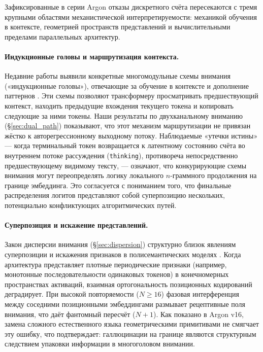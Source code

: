 \documentclass[11pt,a4paper]{article}
\begin{document}
Зафиксированные в серии Argon отказы дискретного счёта пересекаются с тремя крупными областями механистической интерпретируемости: механикой обучения в контексте, геометрией пространств представлений и вычислительными пределами параллельных архитектур.

\paragraph{Индукционные головы и маршрутизация контекста.} Недавние работы выявили конкретные многомодульные схемы внимания («индукционные головы»), отвечающие за обучение в контексте и дополнение паттернов \cite{olsson2022incontext}. Эти схемы позволяют трансформеру просматривать предшествующий контекст, находить предыдущие вхождения текущего токена и копировать следующие за ними токены. Наши результаты по двухканальному вниманию (\S\ref{sec:dual_path}) показывают, что этот механизм маршрутизации не привязан жёстко к авторегрессионному выходному потоку. Наблюдаемые «утечки истины» — когда терминальный токен возвращается к латентному состоянию счёта во внутреннем потоке рассуждения (\texttt{thinking}), противореча непосредственно предшествующему видимому тексту, — означают, что конкурирующие схемы внимания могут переопределять логику локального $n$-граммного продолжения на границе эмбеддинга. Это согласуется с пониманием того, что финальные распределения логитов представляют собой суперпозицию нескольких, потенциально конфликтующих алгоритмических путей.

\paragraph{Суперпозиция и искажение представлений.} Закон дисперсии внимания (\S\ref{sec:dispersion}) структурно близок явлениям суперпозиции и искажения признаков в полисемантических моделях \cite{elhage2022toy, cammarata2020circuits}. Когда архитектура представляет плотные периодические признаки (например, монотонные последовательности одинаковых токенов) в конечномерных пространствах активаций, взаимная ортогональность позиционных кодирований деградирует. При высокой повторяемости ($N \ge 16$) фазовая интерференция между соседними позиционными эмбеддингами размывает рецептивные поля внимания, что даёт фантомный пересчёт ($N+1$). Как показано в Argon v16, замена сложного естественного языка геометрическими примитивами не смягчает эту ошибку, что подтверждает: галлюцинации на границе являются структурным следствием упаковки информации в многоголовом внимании.
\end{document}
